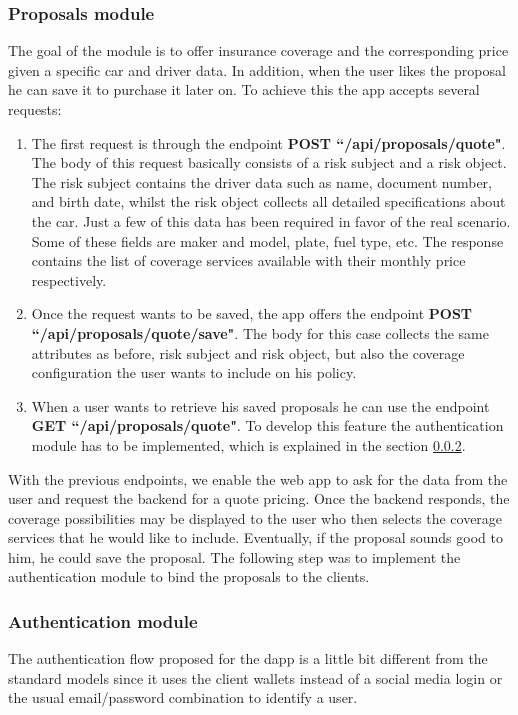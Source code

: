 {\subsubsection{Proposals module}
{
The goal of the module is to offer insurance coverage and the corresponding price given a specific car and driver data.
In addition, when the user likes the proposal he can save it to purchase it later on. To achieve this the app accepts several requests:
\begin{enumerate}
    \item The first request is through the endpoint \textbf{POST ``/api/proposals/quote"}. The body of this request basically consists of a risk subject and a risk object. The risk subject contains the driver data such as name, document number, and birth date, whilst the risk object collects all detailed specifications about the car. Just a few of this data has been required in favor of the real scenario. Some of these fields are maker and model, plate, fuel type, etc. The response contains the list of coverage services available with their monthly price respectively. 
    \item Once the request wants to be saved, the app offers the endpoint \textbf{POST ``/api/proposals/quote/save"}. The body for this case collects the same attributes as before, risk subject and risk object, but also the coverage configuration the user wants to include on his policy. 
   \item When a user wants to retrieve his saved proposals he can use the endpoint \textbf{GET ``/api/proposals/quote"}. To develop this feature the authentication module has to be implemented, which is explained in the section \ref{section:authentication-module}.
\end{enumerate}

With the previous endpoints, we enable the web app to ask for the data from the user and request the backend for a quote pricing. Once the backend responds, the coverage possibilities may be displayed to the user who then selects the coverage services that he would like to include. Eventually, if the proposal sounds good to him, he could save the proposal. The following step was to implement the authentication module to bind the proposals to the clients.
}

\subsubsection{Authentication module}
\label{section:authentication-module}
{
The authentication flow proposed for the dapp is a little bit different from the standard models since it uses the client wallets instead of a social media login or the usual email/password combination to identify a user.

}}
